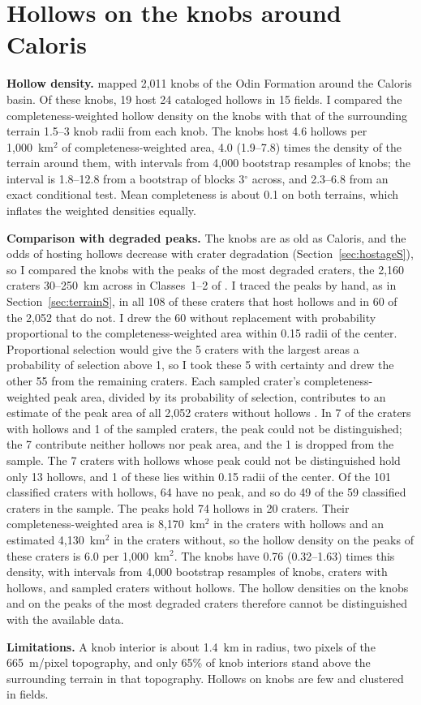 \documentclass{planetary}
\begin{document}
\section{Hollows on the knobs around Caloris}
\label{sec:knobsS}

\textbf{Hollow density.} \textcite{wright2020} mapped 2,011 knobs of the Odin Formation around the Caloris basin. Of these knobs, 19 host 24 cataloged hollows in 15 fields. I compared the completeness-weighted hollow density on the knobs with that of the surrounding terrain 1.5--3 knob radii from each knob. The knobs host 4.6 hollows per 1,000~km$^2$ of completeness-weighted area, 4.0 (1.9--7.8) times the density of the terrain around them, with intervals from 4,000 bootstrap resamples of knobs; the interval is 1.8--12.8 from a bootstrap of blocks 3$^\circ$ across, and 2.3--6.8 from an exact conditional test. Mean completeness is about 0.1 on both terrains, which inflates the weighted densities equally.

\textbf{Comparison with degraded peaks.} The knobs are as old as Caloris, and the odds of hosting hollows decrease with crater degradation (Section~\ref{sec:hostageS}), so I compared the knobs with the peaks of the most degraded craters, the 2,160 craters 30--250~km across in Classes~1--2 of \textcite{kinczykMorphologicalEvaluationCrater2020}. I traced the peaks by hand, as in Section~\ref{sec:terrainS}, in all 108 of these craters that host hollows and in 60 of the 2,052 that do not. I drew the 60 without replacement with probability proportional to the completeness-weighted area within 0.15 radii of the center. Proportional selection would give the 5 craters with the largest areas a probability of selection above 1, so I took these 5 with certainty and drew the other 55 from the remaining craters. Each sampled crater's completeness-weighted peak area, divided by its probability of selection, contributes to an estimate of the peak area of all 2,052 craters without hollows \parencite[the Horvitz--Thompson estimator;][]{horvitz1952}. In 7 of the craters with hollows and 1 of the sampled craters, the peak could not be distinguished; the 7 contribute neither hollows nor peak area, and the 1 is dropped from the sample. The 7 craters with hollows whose peak could not be distinguished hold only 13 hollows, and 1 of these lies within 0.15 radii of the center. Of the 101 classified craters with hollows, 64 have no peak, and so do 49 of the 59 classified craters in the sample. The peaks hold 74 hollows in 20 craters. Their completeness-weighted area is 8,170~km$^2$ in the craters with hollows and an estimated 4,130~km$^2$ in the craters without, so the hollow density on the peaks of these craters is 6.0 per 1,000~km$^2$. The knobs have 0.76 (0.32--1.63) times this density, with intervals from 4,000 bootstrap resamples of knobs, craters with hollows, and sampled craters without hollows. The hollow densities on the knobs and on the peaks of the most degraded craters therefore cannot be distinguished with the available data.

\textbf{Limitations.} A knob interior is about 1.4~km in radius, two pixels of the 665~m/pixel topography, and only 65\% of knob interiors stand above the surrounding terrain in that topography. Hollows on knobs are few and clustered in fields.

\clearpage

\printbibliography

\license{}
\end{document}
